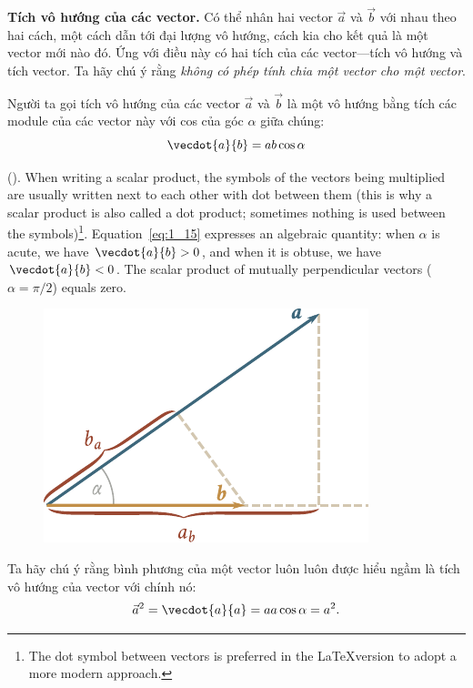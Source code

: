 \textbf{Tích vô hướng của các vector.} Có thể nhân hai vector $\vec{a}$ và $\vec{b}$ với nhau theo hai cách, một cách dẫn tới đại lượng vô hướng, cách kia cho kết quả là một vector mới nào đó. Ứng với điều này có hai tích của các vector---tích vô hướng và tích vector. Ta hãy chú ý rằng \textit{không có phép tính chia một vector cho một vector}.

Người ta gọi tích vô hướng của các vector $\vec{a}$ và $\vec{b}$ là một vô hướng bằng tích các module của các vector này với cos của góc $\alpha$ giữa chúng:
\begin{equation}\label{eq:1_15}
\vecdot{a}{b} = ab\cos\alpha
\end{equation}

\noindent
(). When writing a scalar product, the symbols of the vectors being multiplied are usually written next to each other with dot between them (this is why a scalar product is also called a dot product; sometimes nothing is used between the symbols)\footnote{The dot symbol between vectors is preferred in the \LaTeX version to adopt a more modern approach.}. Equation~\eqref{eq:1_15} expresses an algebraic quantity: when $\alpha$ is acute, we have $\vecdot{a}{b}>0$, and when it is obtuse, we have $\vecdot{a}{b}<0$. The scalar product of mutually perpendicular vectors ($\alpha=\pi/2$) equals zero.

\begin{figure}[!htb]
	\begin{center}
		\includegraphics[scale=0.9]{figures/ch_01/fig_1_15.pdf}
		\caption[]{}
		\label{fig:1_15}
	\end{center}
\end{figure}

Ta hãy chú ý rằng bình phương của một vector luôn luôn được hiểu ngầm là tích vô hướng của vector với chính nó:
\begin{equation}\label{eq:1_16}
\vec{a}^2 = \vecdot{a}{a} = aa\cos\alpha = a^2.
\end{equation}

